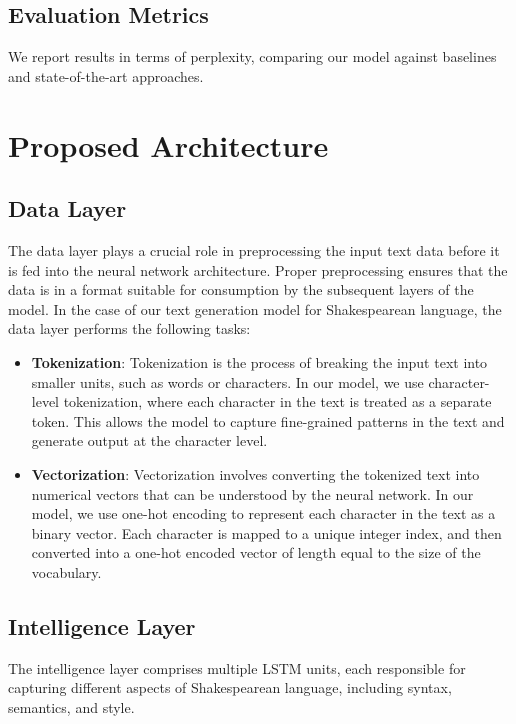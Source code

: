 \documentclass[conference]{IEEEtran}
\begin{document}
\subsection{Evaluation Metrics}
We report results in terms of perplexity, comparing our model against baselines and state-of-the-art approaches.

\section{Proposed Architecture}
\subsection{Data Layer}
The data layer plays a crucial role in preprocessing the input text data before it is fed into the neural network architecture. Proper preprocessing ensures that the data is in a format suitable for consumption by the subsequent layers of the model. In the case of our text generation model for Shakespearean language, the data layer performs the following tasks:

\begin{itemize}
    \item \textbf{Tokenization}: Tokenization is the process of breaking the input text into smaller units, such as words or characters. In our model, we use character-level tokenization, where each character in the text is treated as a separate token. This allows the model to capture fine-grained patterns in the text and generate output at the character level.
    
    \item \textbf{Vectorization}: Vectorization involves converting the tokenized text into numerical vectors that can be understood by the neural network. In our model, we use one-hot encoding to represent each character in the text as a binary vector. Each character is mapped to a unique integer index, and then converted into a one-hot encoded vector of length equal to the size of the vocabulary.
\end{itemize}

\subsection{Intelligence Layer}
The intelligence layer comprises multiple LSTM units, each responsible for capturing different aspects of Shakespearean language, including syntax, semantics, and style.
\end{document}
